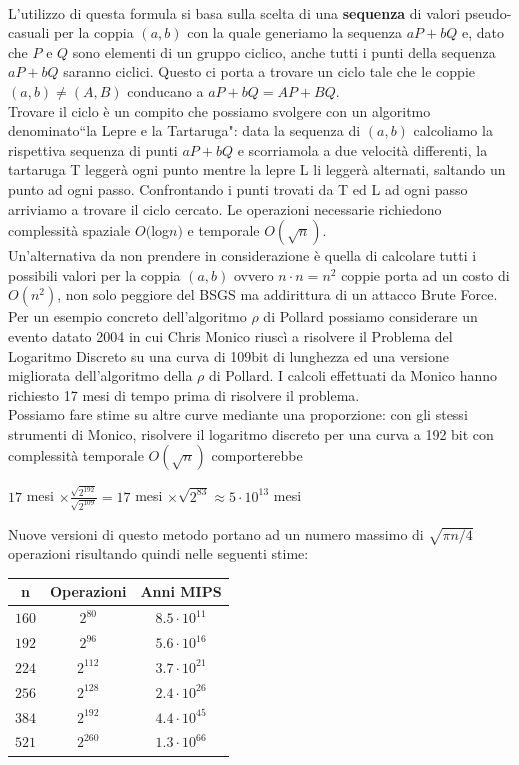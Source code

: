 \documentclass[a4paper,12pt]{tesiinfo}
\newcommand\ddfrac[2]{\frac{\displaystyle #1}{\displaystyle #2}}
\begin{document}
\\
L'utilizzo di questa formula si basa sulla scelta di una \textbf{sequenza} di valori pseudo-casuali per la coppia $(a, b)$ con la quale generiamo la sequenza $aP+bQ$ e, dato che $P$ e $Q$ sono elementi di un gruppo ciclico, anche tutti i punti della sequenza $aP+bQ$ saranno ciclici. Questo ci porta a trovare un ciclo tale che le coppie $(a, b) \ne (A, B)$ conducano a $aP+bQ = AP+BQ$.
\\
Trovare il ciclo \`e un compito che possiamo svolgere con un algoritmo denominato``la Lepre e la Tartaruga": data la sequenza di $(a, b)$ calcoliamo la rispettiva sequenza di punti $aP+bQ$ e scorriamola a due velocit\`a differenti, la tartaruga T legger\`a ogni punto mentre la lepre L li legger\`a alternati, saltando un punto ad ogni passo. Confrontando i punti trovati da T ed L ad ogni passo arriviamo a trovare il ciclo cercato. Le operazioni necessarie richiedono complessit\`a spaziale $O($log$n)$ e temporale $O(\sqrt{n})$.
\\
Un'alternativa da non prendere in considerazione \`e quella di calcolare tutti i possibili valori per la coppia $(a, b)$ ovvero $n \cdot n = n^2$ coppie porta ad un costo di $O(n^2)$, non solo peggiore del BSGS ma addirittura di un attacco Brute Force.
\\
Per un esempio concreto dell'algoritmo $\rho$ di Pollard possiamo considerare un evento datato 2004 in cui Chris Monico riusc\`i a risolvere il Problema del Logaritmo Discreto su una curva di 109bit di lunghezza ed una versione migliorata dell'algoritmo della $\rho$ di Pollard. I calcoli effettuati da Monico hanno richiesto 17 mesi di tempo prima di risolvere il problema. 
\\
Possiamo fare stime su altre curve mediante una proporzione: con gli stessi strumenti di Monico, risolvere il logaritmo discreto per una curva a 192 bit con complessit\`a temporale $O(\sqrt{n})$ comporterebbe
\begin{center}
  $17$ mesi $\times \ddfrac{\sqrt{2^{192}}}{\sqrt{2^{109}}} = 17$ mesi $\times \sqrt{2^{83}} \approx 5 \cdot 10^{13}$ mesi\\
\end{center}
Nuove versioni di questo metodo portano ad un numero massimo di $\sqrt{\pi n \big / 4}$ operazioni risultando quindi nelle seguenti stime:
\begin{center}
\begin{tabular}{ c c c }
  n & Operazioni & Anni MIPS\\
  \hline
  $160$ &$2^{80}$ &$8.5 \cdot 10^{11}$\\
  $192$ &$2^{96}$ &$5.6 \cdot 10^{16}$\\
  $224$ &$2^{112}$ &$3.7 \cdot 10^{21}$\\
  $256$ &$2^{128}$ &$2.4 \cdot 10^{26}$\\
  $384$ &$2^{192}$ &$4.4 \cdot 10^{45}$\\
  $521$ &$2^{260}$ &$1.3 \cdot 10^{66}$\\
\end{tabular}
\end{center}
\end{document}

